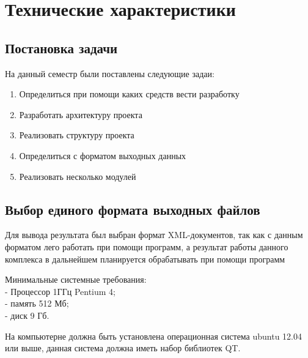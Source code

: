 \section {Технические характеристики}


\subsection {Постановка задачи}

На данный семестр были поставлены следующие задаи:

\begin{enumerate}
\item Определиться при помощи каких средств вести разработку
\item Разработать архитектуру проекта
\item Реализовать структуру проекта 
\item Определиться с форматом выходных данных
\item Реализовать несколько модулей
\end{enumerate}

\subsection {Выбор единого формата выходных файлов}

Для вывода результата был выбран формат XML-документов, так как с данным форматом лего работать при помощи программ, а результат работы данного комплекса в дальнейшем планируется обрабатывать при помощи программ



Минимальные системные требования:\\
- Процессор 1ГГц Pentium 4;\\
- память 512 Мб;\\
- диск 9 Гб.


На компьютерне должна быть установлена операционная система ubuntu 12.04 или выше, данная система должна иметь набор библиотек QT.